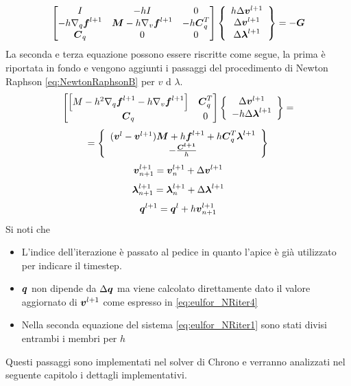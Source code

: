\begin{equation}
        \begin{bmatrix} I & -hI   & 0 \\
    -h\nabla_q{\boldsymbol{f}}^{l+1} & {\boldsymbol{M}}-h\nabla_v{\boldsymbol{f}}^{l+1} &  -h{\boldsymbol{C}}_q^T \\
    {\boldsymbol{C}}_q               &  0                                 &    0  \end{bmatrix}
    \left\{\begin{array}{c}h\Delta{\boldsymbol{v}}^{l+1} \\ \Delta{\boldsymbol{v}}^{l+1} 
    \\ \Delta{\boldsymbol{\lambda}}^{l+1} \end{array} \right\}
    = -{\boldsymbol{G}}
\end{equation}
La seconda e terza equazione possono essere riscritte come segue, la prima è riportata in fondo e vengono aggiunti i passaggi del procedimento di Newton Raphson \ref{eq:NewtonRaphsonB} per $v$ d $\lambda$.
\[
    \begin{bmatrix}\left[ M-h^2\nabla_q{\boldsymbol{f}}^{l+1}-h\nabla_v{\boldsymbol{f}}^{l+1} \right] & {\boldsymbol{C}}_q^T \\{\boldsymbol{C}}_q &0 \end{bmatrix} \left\{\begin{array}{c} \Delta{\boldsymbol{v}}^{l+1}  \\ 
    -h\Delta{\boldsymbol{\lambda}}^{l+1} \end{array} \right\} = \] \begin{equation} \label{eq:eulfor_NRiter1} =
    \left\{\begin{array}{c} ({\boldsymbol{v}}^l-{\boldsymbol{v}}^{l+1}){\boldsymbol{M}}+h{\boldsymbol{f}}^{l+1}+h{\boldsymbol{C}}_q^T {\boldsymbol{\lambda}}^{l+1}\\ -\frac{{\boldsymbol{C^{l+1}}}}{h} \end{array} \right\}
\end{equation}
\begin{equation}
        {\boldsymbol{v}}_{n+1}^{l+1} = {\boldsymbol{v}}_n^{l+1} + \Delta{\boldsymbol{v}}^{l+1}
\end{equation}
\begin{equation}
        {\boldsymbol{\lambda}}_{n+1}^{l+1} = {\boldsymbol{\lambda}}_n^{l+1} + \Delta{\boldsymbol{\lambda}}^{l+1}
\end{equation}
\begin{equation} \label{eq:eulfor_NRiter4}
        {\boldsymbol{q}}^{l+1} = {\boldsymbol{q}}^l + h{\boldsymbol{v}}_{n+1}^{l+1}
\end{equation}
Si noti che \begin{itemize}
    \item L'indice dell'iterazione è passato al pedice in quanto l'apice è già utilizzato per indicare il timestep.
    \item ${\boldsymbol{q}}$ non dipende da $\Delta{\boldsymbol{q}}$ ma viene calcolato direttamente dato il valore aggiornato di ${\boldsymbol{v}}^{l+1}$ come espresso in \ref{eq:eulfor_NRiter4}
    \item Nella seconda equazione del sistema \ref{eq:eulfor_NRiter1} sono stati divisi entrambi i membri per $h$
\end{itemize}    
Questi passaggi sono implementati nel solver di Chrono e verranno analizzati nel seguente capitolo i dettagli implementativi.

